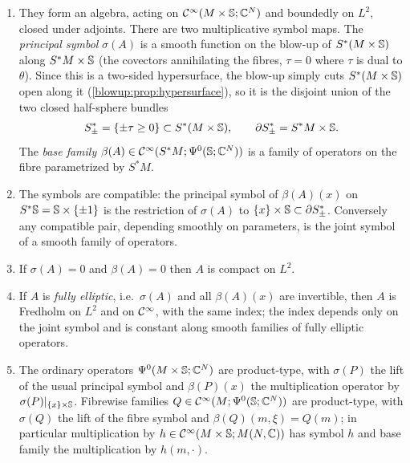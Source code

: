 \begin{enumerate}[label=(P\arabic*)]
\item\label{eta:P1} They form an algebra, acting on $\mathcal{C}^\infty(M\times\mathbb{S};\mathbb{C}^N)$ and
boundedly on $L^2$, closed under adjoints. There are two multiplicative symbol maps.
The \emph{principal symbol} $\sigma(A)$ is a smooth function on the blow-up of
$S^*(M\times\mathbb{S})$ along $S^*M\times\mathbb{S}$ (the covectors annihilating the fibres,
$\tau=0$ where $\tau$ is dual to $\theta$). Since this is a two-sided hypersurface, the
blow-up simply cuts $S^*(M\times\mathbb{S})$ open along it (\cref{blowup:prop:hypersurface}),
so it is the disjoint union of the
two closed half-sphere bundles
\[
S^*_\pm=\{\pm\tau\ge0\}\subset S^*(M\times\mathbb{S}),\qquad\partial S^*_\pm=S^*M\times\mathbb{S}.
\]
The \emph{base family} $\beta(A)\in\mathcal{C}^\infty(S^*M;\Psi^{0}(\mathbb{S};\mathbb{C}^N))$ is a family of
operators on the fibre parametrized by $S^*M$.
\item\label{eta:P2} The symbols are compatible: the principal symbol of $\beta(A)(x)$ on
$S^*\mathbb{S}=\mathbb{S}\times\{\pm1\}$ is the restriction of $\sigma(A)$ to
$\{x\}\times\mathbb{S}\subset\partial S^*_\pm$. Conversely any compatible pair, depending
smoothly on parameters, is the joint symbol of a smooth family of operators.
\item\label{eta:P3} If $\sigma(A)=0$ and $\beta(A)=0$ then $A$ is compact on $L^2$.
\item\label{eta:P4} If $A$ is \emph{fully elliptic}, i.e.\ $\sigma(A)$ and all $\beta(A)(x)$ are
invertible, then $A$ is Fredholm on $L^2$ and on $\mathcal{C}^\infty$, with the same index; the
index depends only on the joint symbol and is constant along smooth families of
fully elliptic operators.
\item\label{eta:P5} The ordinary operators $\Psi^{0}(M\times\mathbb{S};\mathbb{C}^N)$ are product-type,
with $\sigma(P)$ the lift of the usual principal symbol and $\beta(P)(x)$ the
multiplication operator by $\sigma(P)|_{\{x\}\times\mathbb{S}}$. Fibrewise families
$Q\in\mathcal{C}^\infty(M;\Psi^{0}(\mathbb{S};\mathbb{C}^N))$ are product-type, with $\sigma(Q)$ the lift of
the fibre symbol and $\beta(Q)(m,\xi)=Q(m)$; in particular multiplication by
$h\in\mathcal{C}^\infty(M\times\mathbb{S};M(N,\mathbb{C}))$ has symbol $h$ and base family the multiplication by
$h(m,\cdot)$.
\end{enumerate}

